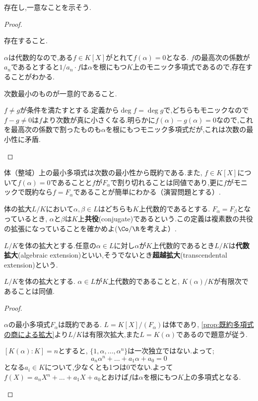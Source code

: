 存在し,一意なことを示そう.
\begin{proof}
	\begin{step}
		\item 存在すること.
		
		$\alpha$は代数的なので,ある$f\in K[X]$がとれて$f(\alpha)=0$となる. $f$の最高次の係数が$a_n$であるとすると$1/a_n\cdot f$は$\alpha$を根にもつ$K$上のモニック多項式であるので,存在することがわかる.
		
		\item 次数最小のものが一意的であること.
		
		$f\neq g$が条件を満たすとする.定義から$\deg f=\deg g$で,どちらもモニックなので$f-g\neq0 $は$f$より次数が真に小さくなる.明らかに$f(\alpha)-g(\alpha)=0$なので,これを最高次の係数で割ったものも$\alpha$を根にもつモニック多項式だが,これは次数の最小性に矛盾.
	\end{step}
\end{proof}

体（整域）上の最小多項式は次数の最小性から既約である.また, $f\in K[X]$について$f(\alpha)=0$であることと$f$が$F_\alpha$で割り切れることは同値であり,更に$f$がモニックで既約なら$f=F_\alpha$であることが簡単にわかる（演習問題とする）.

体の拡大$L/K$において$\alpha,\beta\in L$はどちらも$K$上代数的であるとする. $F_\alpha=F_\beta$となっているとき, $\alpha$と$\beta$は$K$上\textbf{共役}(conjugate)であるという.この定義は複素数の共役の拡張になっていることを確かめよ($\Co/\R$を考えよ）.


\begin{defi}
	$L/K$を体の拡大とする.任意の$\alpha\in L$に対し$\alpha$が$K$上代数的であるとき$L/K$は\textbf{代数拡大}(algebraic extension)といい,そうでないとき\textbf{超越拡大}(transcendental extension)という.
\end{defi}

\begin{prop}
	$L/K$を体の拡大とする. $\alpha\in L$が$K$上代数的であることと, $K(\alpha)/K$が有限次であることは同値.
\end{prop}

\begin{proof}
	\begin{eqv}
		\item $\alpha$の最小多項式$F_\alpha$は既約である. $L=K[X]/(F_\alpha)$は体であり, \ref{prop:既約多項式の商による拡大}より$L/K$は有限次拡大,また$L=K(\alpha)$であるので題意が従う.
		
		\item $[K(\alpha):K]=n$とすると, $\{1,\alpha,\dots,\alpha^n\}$は一次独立ではない.よって;
		\[a_n\alpha^n+\dots+a_1\alpha+a_0=0\]
		となる$a_i\in K$について,少なくとも1つは0でない.よって$f(X)=a_nX^n+\dots+a_1X+a_0$とおけば$f$は$\alpha$を根にもつ$K$上の多項式となる.
	\end{eqv}
\end{proof}

